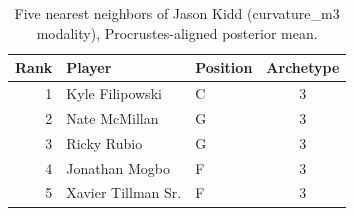 \begin{table}[htbp]
  \centering\small
  \begin{tabular}{rllc}
    \toprule
    Rank & Player & Position & Archetype \\
    \midrule
    1 & Kyle Filipowski & C & 3 \\
    2 & Nate McMillan & G & 3 \\
    3 & Ricky Rubio & G & 3 \\
    4 & Jonathan Mogbo & F & 3 \\
    5 & Xavier Tillman Sr. & F & 3 \\
    \bottomrule
  \end{tabular}
  \caption{Five nearest neighbors of Jason Kidd (curvature_m3 modality), Procrustes-aligned posterior mean.}
  \label{tab:Jason_Kidd_neighbors_curvature_m3}
\end{table}

